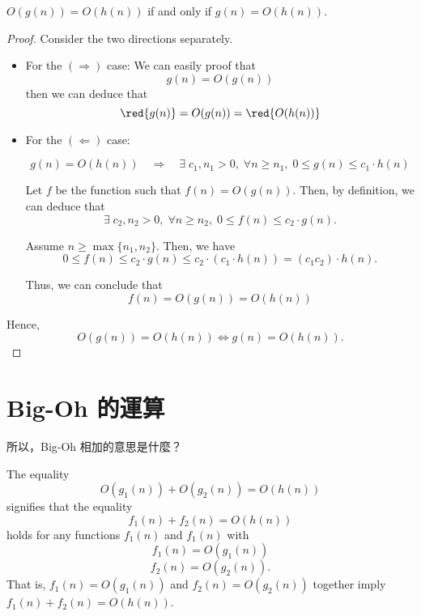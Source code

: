 \begin{theorem}\label{thm:1.3.1}
    $O(g(n)) = O(h(n))$ if and only if $g(n) = O(h(n))$.
\end{theorem}
\begin{proof}
Consider the two directions separately.
\begin{itemize}
    \item For the $(\Rightarrow)$ case: 
    We can easily proof that \[
        g(n) = O(g(n))
    \]
    then we can deduce that \[
        \red{g(n)} = O(g(n)) = \red{O(h(n))}
    \]
    
    \item For the $(\Leftarrow)$ case: 
    \begin{prev}
        \[
        g(n) = O(h(n)) \quad \Rightarrow \quad \exists \; c_1, n_1 > 0, \; \forall n \geq n_1, \; 0 \leq g(n) \leq c_1 \cdot h(n)
        \]
    \end{prev}

    Let $f$ be the function such that $f(n) = O(g(n))$. Then, by definition, we can deduce that
    \[
        \exists \; c_2, n_2 > 0, \; \forall n \geq n_2, \; 0 \leq f(n) \leq c_2 \cdot g(n).
    \]

    Assume $n \geq \max\{n_1, n_2\}$. Then, we have
    \[
        0 \leq f(n) \leq c_2 \cdot g(n) \leq c_2 \cdot (c_1 \cdot h(n)) = (c_1 c_2) \cdot h(n).
    \]

    Thus, we can conclude that \[
        f(n) = O(g(n)) = O(h(n))
    \]
\end{itemize}
    Hence, \[
        O(g(n)) = O(h(n)) \iff g(n) = O(h(n)).
    \]
\end{proof}

\section{Big-Oh 的運算}

\begin{exercise}
    所以，Big-Oh 相加的意思是什麼？
\end{exercise}

\begin{definition}
    The equality $$O(g_1(n)) + O(g_2(n)) = O(h(n))$$ signifies that the equality
    \[
    f_1(n) + f_2(n) = O(h(n))
    \]
    holds for any functions $f_1(n)$ and $f_1(n)$ with
    \[
    f_1(n) = O(g_1(n))
    \]
    \[
    f_2(n) = O(g_2(n)).
    \]
    That is, $f_1(n) = O(g_1(n))$ and $f_2(n) = O(g_2(n))$ together imply $f_1(n) + f_2(n) = O(h(n))$.
\end{definition}
    

